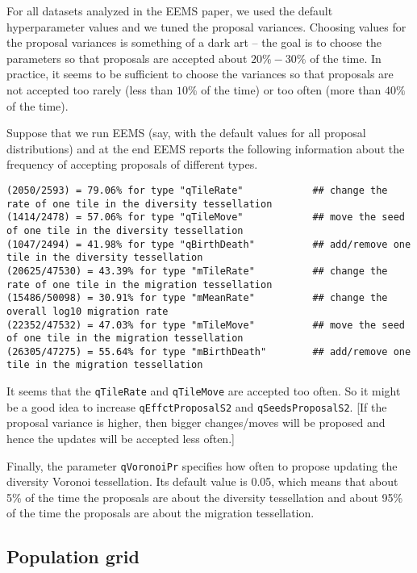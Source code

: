 \documentclass[a4paper,10pt,DIV=15,titlepage,mpinclude=true]{scrartcl}
\newcommand{\keystring}[1]{{\tt #1}}
\begin{document}
For all datasets analyzed in the EEMS paper, we used the default hyperparameter values and we tuned the proposal variances. Choosing values for the proposal variances is something of a dark art -- the goal is to choose the parameters so that proposals are accepted about $20\%-30\%$ of the time. In practice, it seems to be sufficient to choose the variances so that proposals are not accepted too rarely (less than $10\%$ of the time) or too often (more than $40\%$ of the time).

Suppose that we run EEMS (say, with the default values for all proposal distributions) and at the end EEMS reports the following information about the frequency of accepting proposals of different types.

\begin{lstlisting}[style=Cppcode]
(2050/2593) = 79.06% for type "qTileRate"            ## change the rate of one tile in the diversity tessellation
(1414/2478) = 57.06% for type "qTileMove"            ## move the seed of one tile in the diversity tessellation
(1047/2494) = 41.98% for type "qBirthDeath"          ## add/remove one tile in the diversity tessellation
(20625/47530) = 43.39% for type "mTileRate"          ## change the rate of one tile in the migration tessellation
(15486/50098) = 30.91% for type "mMeanRate"          ## change the overall log10 migration rate
(22352/47532) = 47.03% for type "mTileMove"          ## move the seed of one tile in the migration tessellation
(26305/47275) = 55.64% for type "mBirthDeath"        ## add/remove one tile in the migration tessellation
\end{lstlisting}

It seems that the \keystring{qTileRate} and \keystring{qTileMove} are accepted too often. So it might be a good idea to increase \keystring{qEffctProposalS2} and \keystring{qSeedsProposalS2}. [If the proposal variance is higher, then bigger changes/moves will be proposed and hence the updates will be accepted less often.]

Finally, the parameter \keystring{qVoronoiPr} specifies how often to propose updating the diversity Voronoi tessellation. Its default value is 0.05, which means that about 5\% of the time the proposals are about the diversity tessellation and about 95\% of the time the proposals are about the migration tessellation.

\subsection{Population grid}\label{sec:pop-grid}
\end{document}
